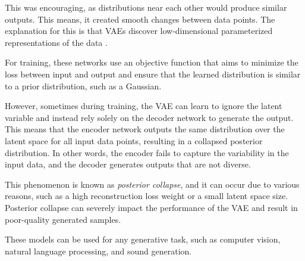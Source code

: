 This was encouraging, as distributions near each other would produce similar outputs. This means, it created smooth changes between data points. The explanation for this is that \acp{VAE} discover low-dimensional parameterized representations of the data \cite{huzaifah_deep_2021}.

For training, these networks use an objective function that aims to minimize the loss between input and output and ensure that the learned distribution is similar to a prior distribution, such as a Gaussian.

However, sometimes during training, the \ac{VAE} can learn to ignore the latent variable and instead rely solely on the decoder network to generate the output. This means that the encoder network outputs the same distribution over the latent space for all input data points, resulting in a collapsed posterior distribution. In other words, the encoder fails to capture the variability in the input data, and the decoder generates outputs that are not diverse.

This phenomenon is known as \textit{posterior collapse}, and it can occur due to various reasons, such as a high reconstruction loss weight or a small latent space size. Posterior collapse can severely impact the performance of the \ac{VAE} and result in poor-quality generated samples.

These models can be used for any generative task, such as computer vision, natural language processing, and sound generation.
